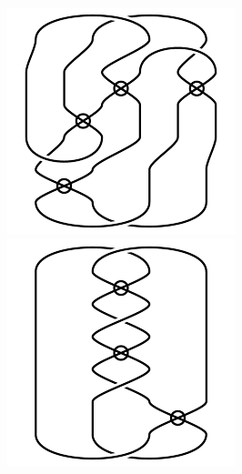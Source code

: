 \begin{figure}[H]
\begin{minipage}[b]{.18\linewidth}
\end{minipage}
\begin{minipage}[b]{.18\linewidth}
\centering
\includegraphics[width=\linewidth]{../data/virtual_4_79.png}
\end{minipage}
\begin{minipage}[b]{.18\linewidth}
\centering
\includegraphics[width=\linewidth]{../data/virtual_4_80.png}

\end{minipage}
\end{figure}
